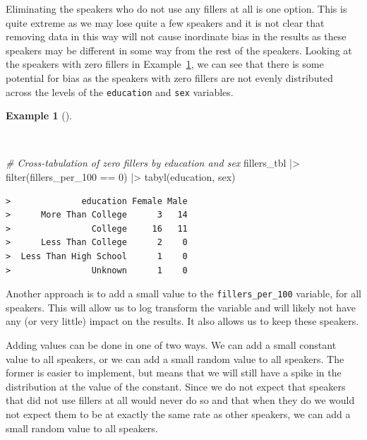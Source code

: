 \documentclass[
  letterpaper,
]{latex/krantz}
\newenvironment{Shaded}{\begin{snugshade}}{\end{snugshade}}
\newcommand{\CommentTok}[1]{\textcolor[rgb]{0.00,0.00,0.00}{\textit{#1}}}
\newcommand{\DecValTok}[1]{\textcolor[rgb]{0.00,0.00,0.00}{#1}}
\newcommand{\FunctionTok}[1]{\textcolor[rgb]{0.00,0.00,0.00}{#1}}
\newcommand{\NormalTok}[1]{\textcolor[rgb]{0.00,0.00,0.00}{#1}}
\newcommand{\SpecialCharTok}[1]{\textcolor[rgb]{0.00,0.00,0.00}{#1}}
\theoremstyle{definition}
\newtheorem{example}{Example}[chapter]
\theoremstyle{remark}
\begin{document}
Eliminating the speakers who do not use any fillers at all is one
option. This is quite extreme as we may lose quite a few speakers and it
is not clear that removing data in this way will not cause inordinate
bias in the results as these speakers may be different in some way from
the rest of the speakers. Looking at the speakers with zero fillers in
Example~\ref{exm-ida-num-uni-zero-fillers}, we can see that there is
some potential for bias as the speakers with zero fillers are not evenly
distributed across the levels of the \texttt{education} and \texttt{sex}
variables.

\begin{example}[]\protect\hypertarget{exm-ida-num-uni-zero-fillers}{}\label{exm-ida-num-uni-zero-fillers}

~

\begin{Shaded}
\begin{Highlighting}[]
\CommentTok{\# Cross{-}tabulation of zero fillers by education and sex}
\NormalTok{fillers\_tbl }\SpecialCharTok{|\textgreater{}}
  \FunctionTok{filter}\NormalTok{(fillers\_per\_100 }\SpecialCharTok{==} \DecValTok{0}\NormalTok{) }\SpecialCharTok{|\textgreater{}}
  \FunctionTok{tabyl}\NormalTok{(education, sex)}
\end{Highlighting}
\end{Shaded}

\begin{verbatim}
>              education Female Male
>      More Than College      3   14
>                College     16   11
>      Less Than College      2    0
>  Less Than High School      1    0
>                Unknown      1    0
\end{verbatim}

\end{example}

Another approach is to add a small value to the
\texttt{fillers\_per\_100} variable, for all speakers. This will allow
us to log transform the variable and will likely not have any (or very
little) impact on the results. It also allows us to keep these speakers.

Adding values can be done in one of two ways. We can add a small
constant value to all speakers, or we can add a small random value to
all speakers. The former is easier to implement, but means that we will
still have a spike in the distribution at the value of the constant.
Since we do not expect that speakers that did not use fillers at all
would never do so and that when they do we would not expect them to be
at exactly the same rate as other speakers, we can add a small random
value to all speakers.
\end{document}
